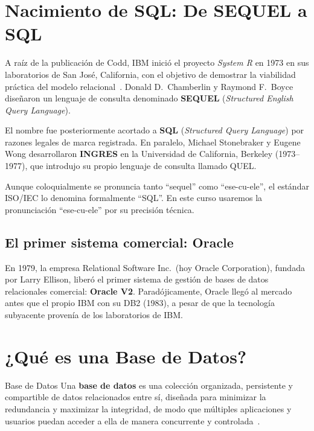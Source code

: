 \documentclass[12pt, a4paper]{article}
\begin{document}
	\section{Nacimiento de SQL: De SEQUEL a SQL}
	
	A raíz de la publicación de Codd, IBM inició el proyecto
	\textit{System R} en 1973 en sus laboratorios de San José,
	California, con el objetivo de demostrar la viabilidad práctica del
	modelo relacional~\cite{chamberlin1974}.
	Donald D.\ Chamberlin y Raymond F.\ Boyce diseñaron un lenguaje de
	consulta denominado \textbf{SEQUEL}
	(\textit{Structured English Query Language}).
	
	El nombre fue posteriormente acortado a \textbf{SQL}
	(\textit{Structured Query Language}) por razones legales de marca
	registrada.
	En paralelo, Michael Stonebraker y Eugene Wong desarrollaron
	\textbf{INGRES} en la Universidad de California, Berkeley (1973–1977),
	que introdujo su propio lenguaje de consulta llamado QUEL.
	
	\begin{nota}
		Aunque coloquialmente se pronuncia tanto ``sequel'' como
		``ese-cu-ele'', el estándar ISO/IEC lo denomina formalmente
		``SQL''. En este curso usaremos la pronunciación ``ese-cu-ele''
		por su precisión técnica.
	\end{nota}
	
	\subsection{El primer sistema comercial: Oracle}
	
	En 1979, la empresa Relational Software Inc.\ (hoy Oracle
	Corporation), fundada por Larry Ellison, liberó el primer
	sistema de gestión de bases de datos relacionales comercial:
	\textbf{Oracle V2}.
	Paradójicamente, Oracle llegó al mercado antes que el propio
	IBM con su DB2 (1983), a pesar de que la tecnología subyacente
	provenía de los laboratorios de IBM.
	
	\section{¿Qué es una Base de Datos?}
	
	\begin{definicion}{Base de Datos}
		Una \textbf{base de datos} es una colección organizada, persistente
		y compartible de datos relacionados entre sí, diseñada para
		minimizar la redundancia y maximizar la integridad, de modo que
		múltiples aplicaciones y usuarios puedan acceder a ella de manera
		concurrente y controlada~\cite{date2003introduction}.
	\end{definicion}
	
\end{document}
